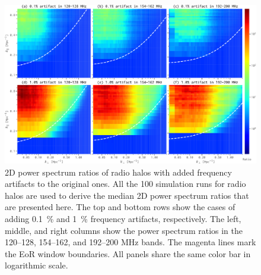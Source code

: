 \documentclass[modern]{aastex62}
\begin{document}
\begin{figure}
  \centering
  \includegraphics[width=\textwidth]{ps2d-ratio-crp-halos-3bands}
  \caption{\label{fig:ps2d-ratio-crp}%
    2D power spectrum ratios of radio halos with added frequency
    artifacts to the original ones.
    All the 100 simulation runs for radio halos are used to derive
    the median 2D power spectrum ratios that are presented here.
    The top and bottom rows show the cases of adding \SI{0.1}{\percent}
    and \SI{1}{\percent} frequency artifacts, respectively.
    The left, middle, and right columns show the power spectrum ratios
    in the \numrange{120}{128}, \numrange{154}{162}, and
    \numrange{192}{200} \si{\MHz} bands.
    The magenta lines mark the EoR window boundaries.
    All panels share the same color bar in logarithmic scale.
  }
\end{figure}
\end{document}
